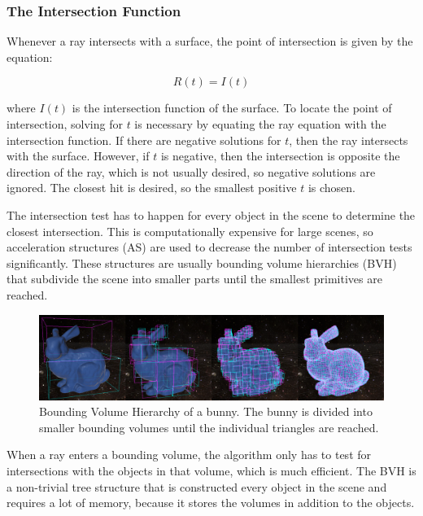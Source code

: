 \documentclass[12pt]{article}
\begin{document}
\subsubsection{The Intersection Function}

Whenever a ray intersects with a surface, the point of intersection is given by the equation:

\begin{equation}
    R(t) = I(t)
\end{equation}

where $I(t)$ is the intersection function of the surface. To locate the point of intersection,
solving for $t$ is necessary by equating the ray equation with the intersection function. 
If there are negative solutions for $t$, then the ray intersects with the surface. However, 
if $t$ is negative, then the intersection is opposite the direction of the ray, which is not usually desired,
so negative solutions are ignored. The closest hit is desired, so the smallest positive $t$ is chosen.

The intersection test has to happen for every object in the scene to determine the closest intersection.
This is computationally expensive for large scenes, so acceleration structures (AS) are used to decrease the number of intersection tests significantly.
These structures are usually bounding volume hierarchies (BVH) that subdivide the scene into smaller parts until the smallest primitives are reached.

\begin{figure}[h]
    \includegraphics[scale=0.22]{BVH-Visualization}
    \caption{
        Bounding Volume Hierarchy of a bunny. 
        The bunny is divided into smaller bounding volumes until the individual triangles are reached.
        \parencite{Medium:BVH-Visualization}}
    \label{fig:BVH-Visualization}
\end{figure}

When a ray enters a bounding volume, the algorithm only has to test for intersections with the objects in that volume, which is much efficient.
The BVH is a non-trivial tree structure that is constructed every object in the scene and requires a lot of memory, because
it stores the volumes in addition to the objects.
\end{document}
